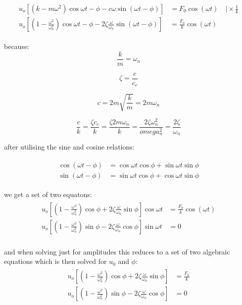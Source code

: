 \documentclass[10pt,b5paper,titlepage]{book}
\newenvironment{eqarray}
{
    \begin{eqnarray}
        \begin{aligned}
}
{
        \end{aligned}
    \end{eqnarray}
}
\begin{document}
\begin{eqarray}
    u_o \left[ \left(k - m \omega^2\right) \cos{\omega t - \phi} -
    c \omega \sin{\left( \omega t - \phi \right)} \right]
    &= F_0 \cos{\left( \omega t \right)} \quad \vert \times \frac{1}{k}\\
        u_o \left[ \left(1 - \frac{\omega^2}{\omega_n^2} \right) \cos{\omega t - \phi} -
        2 \zeta \frac{\omega}{\omega_n} \sin{\left( \omega t - \phi \right)} \right]
    &= \frac{F_0}{k} \cos{\left( \omega t \right)}
\end{eqarray}

because:
\begin{equation}
    \frac{k}{m} = \omega_n
\end{equation}

\begin{equation}
    \zeta = \frac{c}{c_c}
\end{equation}

\begin{equation}
    c = 2 m \sqrt{\frac{k}{m}} = 2 m \omega_n
\end{equation}

\begin{equation}
    \frac{c}{k} = \frac{\zeta c_c}{k} = \frac{\zeta 2 m \omega_n}{k}
    = \frac{2 \zeta \omega_n^2}{omega_n^2} = \frac{2 \zeta}{\omega_n}
\end{equation}

after utilising the sine and cosine relations:

\begin{eqarray}
    \cos{\left( \omega t - \phi \right)} &=
    \cos{\omega t} \cos{\phi} + \sin{\omega t} \sin{\phi}\\
    \sin{\left( \omega t - \phi \right)} &=
    \sin{\omega t} \cos{\phi} + \cos{\omega t} \sin{\phi}
\end{eqarray}

we get a set of two equatons:
\begin{eqarray}
    u_o \left[ \left(1 - \frac{\omega^2}{\omega_n^2} \right) \cos{\phi} +
    2 \zeta \frac{\omega}{\omega_n} \sin{\phi} \right] \cos{\omega t}
    &= \frac{F_0}{k} \cos{\left( \omega t \right)}\\
    u_o \left[ \left(1 - \frac{\omega^2}{\omega_n^2} \right) \sin{\phi} -
    2 \zeta \frac{\omega}{\omega_n} \cos{\phi} \right] \sin{\omega t}
    &= 0\\
\end{eqarray}

and when solving just for amplitudes this reduces to a set of two algebraic equations
which is then solved for $ u_0 $ and $ \phi $:
\begin{eqarray}
    u_o \left[ \left(1 - \frac{\omega^2}{\omega_n^2} \right) \cos{\phi} +
    2 \zeta \frac{\omega}{\omega_n} \sin{\phi} \right]
    &= \frac{F_0}{k}\\
    u_o \left[ \left(1 - \frac{\omega^2}{\omega_n^2} \right) \sin{\phi} -
    2 \zeta \frac{\omega}{\omega_n} \cos{\phi} \right]
    &= 0\\
\end{eqarray}
\end{document}
